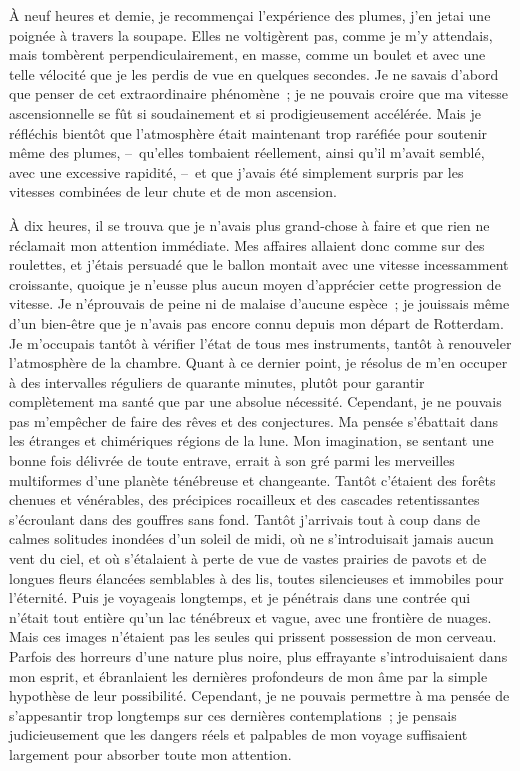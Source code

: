 \documentclass[french,twoside]{book} %
\begin{document}
À neuf heures et demie, je recommençai l’expérience des plumes, j’en jetai une poignée à travers la soupape. Elles ne voltigèrent pas, comme je m’y attendais, mais tombèrent perpendiculairement, en masse, comme un boulet et avec une telle vélocité que je les perdis de vue en quelques secondes. Je ne savais d’abord que penser de cet extraordinaire phénomène ; je ne pouvais croire que ma vitesse ascensionnelle se fût si soudainement et si prodigieusement accélérée. Mais je réfléchis bientôt que l’atmosphère était maintenant trop raréfiée pour soutenir même des plumes, – qu’elles tombaient réellement, ainsi qu’il m’avait semblé, avec une excessive rapidité, – et que j’avais été simplement surpris par les vitesses combinées de leur chute et de mon ascension.\par
À dix heures, il se trouva que je n’avais plus grand-chose à faire et que rien ne réclamait mon attention immédiate. Mes affaires allaient donc comme sur des roulettes, et j’étais persuadé que le ballon montait avec une vitesse incessamment croissante, quoique je n’eusse plus aucun moyen d’apprécier cette progression de vitesse. Je n’éprouvais de peine ni de malaise d’aucune espèce ; je jouissais même d’un bien-être que je n’avais pas encore connu depuis mon départ de Rotterdam. Je m’occupais tantôt à vérifier l’état de tous mes instruments, tantôt à renouveler l’atmosphère de la chambre. Quant à ce dernier point, je résolus de m’en occuper à des intervalles réguliers de quarante minutes, plutôt pour garantir complètement ma santé que par une absolue nécessité. Cependant, je ne pouvais pas m’empêcher de faire des rêves et des conjectures. Ma pensée s’ébattait dans les étranges et chimériques régions de la lune. Mon imagination, se sentant une bonne fois délivrée de toute entrave, errait à son gré parmi les merveilles multiformes d’une planète ténébreuse et changeante. Tantôt c’étaient des forêts chenues et vénérables, des précipices rocailleux et des cascades retentissantes s’écroulant dans des gouffres sans fond. Tantôt j’arrivais tout à coup dans de calmes solitudes inondées d’un soleil de midi, où ne s’introduisait jamais aucun vent du ciel, et où s’étalaient à perte de vue de vastes prairies de pavots et de longues fleurs élancées semblables à des lis, toutes silencieuses et immobiles pour l’éternité. Puis je voyageais longtemps, et je pénétrais dans une contrée qui n’était tout entière qu’un lac ténébreux et vague, avec une frontière de nuages. Mais ces images n’étaient pas les seules qui prissent possession de mon cerveau. Parfois des horreurs d’une nature plus noire, plus effrayante s’introduisaient dans mon esprit, et ébranlaient les dernières profondeurs de mon âme par la simple hypothèse de leur possibilité. Cependant, je ne pouvais permettre à ma pensée de s’appesantir trop longtemps sur ces dernières contemplations ; je pensais judicieusement que les dangers réels et palpables de mon voyage suffisaient largement pour absorber toute mon attention.\par
\end{document}

